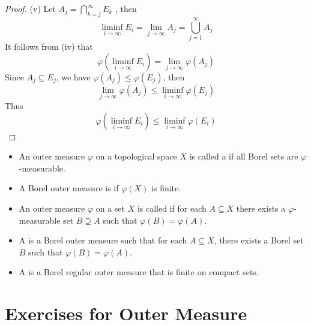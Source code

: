\documentclass[../main.tex]{subfiles}
\begin{document}
\begin{proof}
    (v)  Let \(  A_{j}=  \bigcap_{k= j}^{\infty}E_{k}   \) , then \[
    \liminf_{i\to \infty}E_{i}= \lim_{j\to \infty}A_{j}= \bigcup _{j = 1}^{\infty}A_{j}
    \] It follows from (iv) that \[
     \varphi \left( \liminf_{i\to \infty}E_{i} \right)= \lim_{j\to \infty} \varphi \left( A_{j} \right)  
    \] Since \(  A_{j}\subseteq  E_{j}  \), we have \(   \varphi \left( A_{j} \right)\le  \varphi \left( E_{j} \right)    \), then \[
    \lim_{j\to \infty} \varphi \left( A_{j} \right)\le \liminf_{i\to \infty} \varphi \left( E_{j} \right)  
    \]   Thus \[
     \varphi \left( \liminf_{i\to \infty}E_{i} \right)\le \liminf_{i\to \infty} \varphi \left( E_{i} \right)  
    \]
\end{proof}

\begin{definition}{}{}
    \begin{itemize}
        \item An outer measure \(   \varphi   \) on a topological space \(  X  \) is called a  if all Borel sets are \(   \varphi   \)-measurable. 
        \item A Borel outer measure is  if \(   \varphi \left( X \right)    \) is finite.
        \item An outer measure \(   \varphi   \) on a set \(  X  \) is called  if for each \(  A\subseteq X  \) there exists a \(   \varphi   \)-measurable set \(  B\supseteq A  \) such that \(   \varphi \left( B \right)=  \varphi \left( A \right)    \). 
        \item A  is a Borel outer measure such that for each \(  A\subseteq X  \), there exists a Borel set \(  B  \) such that \(   \varphi \left( B \right)=  \varphi \left( A \right)    \).    
        \item A  is a Borel regular outer measure that is finite on compact sets.             
    \end{itemize}
    
\end{definition}
\section*{Exercises for Outer Measure}
\end{document}
